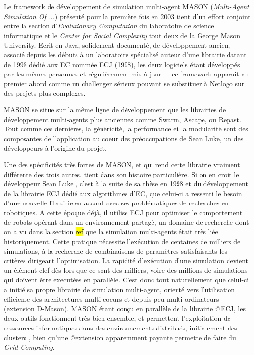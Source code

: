 Le framework de développement de simulation multi-agent MASON (\textit{Multi-Agent Simulation Of ...}) présenté pour la première fois en 2003 tient d'un effort conjoint entre la section d'\textit{Evolutionary Computation} du laboratoire de science informatique et le \textit{Center for Social Complexity} tout deux de la George Mason University. Ecrit en Java, solidement documenté, de développement ancien, associé depuis les débuts à un laboratoire spécialisé auteur d'une librairie datant de 1998 dédié aux EC nommée ECJ (1998), les deux logiciels étant développés par les mêmes personnes et régulièrement mis à jour ... ce framework apparait au premier abord comme un challenger sérieux pouvant se substituer à Netlogo sur des projets plus complexes.

MASON se situe sur la même ligne de développement que les librairies de développement multi-agents plus anciennes comme Swarm, Ascape, ou Repast. Tout comme ces dernières, la généricité, la performance et la modularité sont des composantes de l'application au coeur des préoccupations de Sean Luke, un des développeurs à l'origine du projet.

Une des spécificités très fortes de MASON, et qui rend cette librairie vraiment différente des trois autres, tient dans son histoire particulière. Si on en croit le développeur Sean Luke , c'est à la suite de sa thèse en 1998 et du développement de la librairie ECJ  dédié aux algorithmes d'EC, que celui-ci a ressenti le besoin d'une nouvelle librairie en accord avec ses problématiques de recherches en robotiques. A cette époque déjà, il utilise ECJ pour optimiser le comportement de robots opérant dans un environnement partagé, un domaine de recherche dont on a vu dans la section \hl{ref} que la simulation multi-agents était très liée historiquement. Cette pratique nécessite l'exécution de centaines de milliers de simulations, à la recherche de combinaisons de paramètres satisfaisants les critères dirigeant l'optimisation. La rapidité d'exécution d'une simulation devient un élément clef dès lors que ce sont des milliers, voire des millions de simulations qui doivent être executées en parallèle. C'est donc tout naturellement que celui-ci a initié sa propre librairie de simulation multi-agent, orienté vers l'utilisation efficiente des architectures multi-coeurs et depuis peu multi-ordinateurs (extension D-Mason). MASON étant conçu en parallèle de la librairie \href{http://cs.gmu.edu/~eclab/projects/ecj/}{@ECJ}, les deux outils fonctionnent très bien ensemble, et permettent l'exploitation de ressources informatiques dans des environnements distribués, initialement des clusters \autocite[211]{Luke2014}, bien qu'une \href{http://www.parabon.com/dev-center/origin}{@extension} apparemment payante permette de faire du \textit{Grid Computing}.

